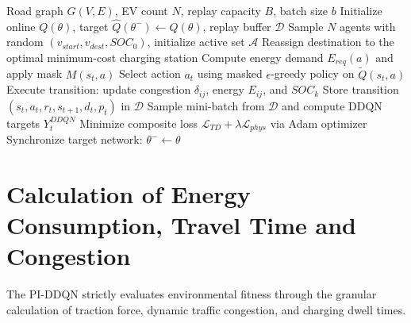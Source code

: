 \documentclass{article}
\begin{document}
\begin{algorithm}[ht]
\caption{Multi-Agent PI-DDQN Routing with Physics Masking}
\label{algo:piddqn_detailed}
\begin{algorithmic}[1]
\REQUIRE Road graph $G(V,E)$, EV count $N$, replay capacity $B$, batch size $b$
\STATE Initialize online $Q(\theta)$, target $\hat{Q}(\theta^-)\leftarrow Q(\theta)$, replay buffer $\mathcal{D}$
    \STATE Sample $N$ agents with random $(v_{start}, v_{dest}, SOC_0)$, initialize active set $\mathcal{A}$
                \STATE Reassign destination to the optimal minimum-cost charging station
            \ENDIF
            \STATE Compute energy demand $E_{req}(a)$ and apply mask $M(s_t, a)$
            \STATE Select action $a_t$ using masked $\epsilon$-greedy policy on $\tilde{Q}(s_t, a)$
            \STATE Execute transition: update congestion $\delta_{ij}$, energy $E_{ij}$, and $SOC_k$
            \STATE Store transition $(s_t,a_t,r_t,s_{t+1},d_t,p_t)$ in $\mathcal{D}$
        \ENDFOR
            \STATE Sample mini-batch from $\mathcal{D}$ and compute DDQN targets $Y_t^{DDQN}$
            \STATE Minimize composite loss $\mathcal{L}_{TD}+\lambda\mathcal{L}_{phys}$ via Adam optimizer
        \ENDIF
    \ENDFOR
        \STATE Synchronize target network: $\theta^{-}\leftarrow\theta$
    \ENDIF
\ENDFOR
\end{algorithmic}
\end{algorithm}

\section{Calculation of Energy Consumption, Travel Time and Congestion}
\label{sec:energy_time_congestion}
The PI-DDQN strictly evaluates environmental fitness through the granular calculation of traction force, dynamic traffic congestion, and charging dwell times.
\end{document}
